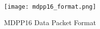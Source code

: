 \documentclass[jon_ringuette_thesis.tex]{subfiles}
\begin{document}
\label{sec:MDPP16}
\begin{figure}[H]
\texttt{[image: mdpp16\_format.png]}
  \caption{MDPP16 Data Packet Format \cite{mesytec_mdpp16_manual}}
  \label{MDPP16_Data_Format}
\end{figure}
\end{document}
